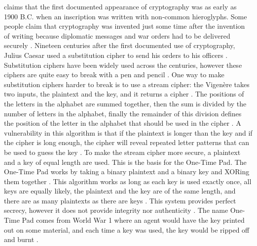 \documentclass{l4proj}
\begin{document}
\citet{kessler_overview_2016} claims that the first documented appearance of cryptography was as early as 1900 B.C. when an inscription was written with non-common hieroglyphs.
Some people claim that cryptography was invented just some time after the invention of writing because diplomatic messages and war orders had to be delivered securely 
\citep{kessler_overview_2016}. Nineteen centuries after the first documented use of cryptography, Julius Caesar used a substitution cipher to send his orders to his officers 
\citep{anderson_security_2008}. Substitution ciphers have been widely used across the centuries, however these ciphers are quite easy to break with a pen and pencil 
\citep{anderson_security_2008}. One way to make substitution ciphers harder to break is to use a stream cipher: the Vigenère takes two inputs, the plaintext and the key, and it
returns a cipher \citep{anderson_security_2008}. The positions of the letters in the alphabet are summed together, then the sum is divided by the number of letters in the alphabet, 
finally the remainder of this division defines the position of the letter in the alphabet that should be used in the cipher \citep{anderson_security_2008}. 
A vulnerability in this algorithm is that if the plaintext is longer than the key and if the cipher is long enough, the cipher will reveal repeated letter patterns 
that can be used to guess the key \citep{anderson_security_2008}. To make the stream cipher more secure, a plaintext and a key of equal length are used. 
This is the basis for the One-Time Pad. The One-Time Pad works by taking a binary plaintext and a binary key and XORing them together \citep{savage_cse_2019}.
This algorithm works as long as each key is used exactly once, all keys are equally likely, the plaintext and the key are of the same length, and there are as many plaintexts 
as there are keys \citep{savage_cse_2019} \citep{anderson_security_2008}. This system provides perfect secrecy, however it does not provide integrity nor authenticity 
\citep{savage_cse_2019}. The name One-Time Pad comes from World War 1 where an agent would have the key printed out on some material, and each time a key was used, the key would
be ripped off and burnt \citep{anderson_security_2008}. 
\end{document}
